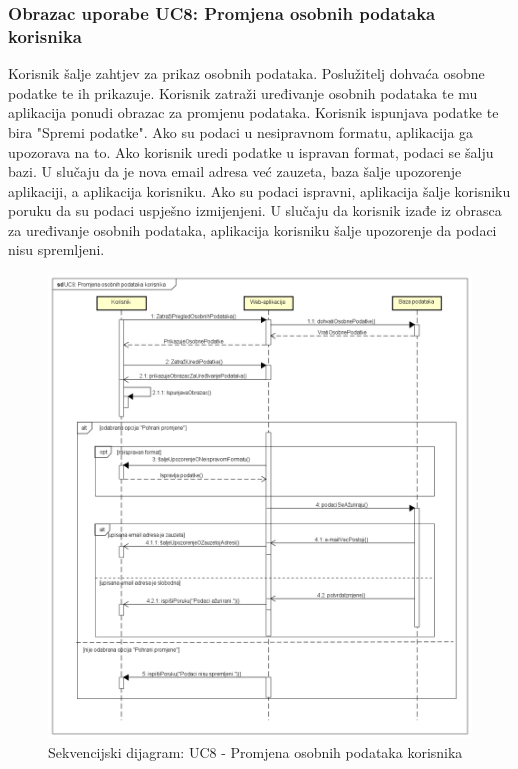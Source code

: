 			\subsubsection{Obrazac uporabe UC8: Promjena osobnih podataka korisnika}
			Korisnik šalje zahtjev za prikaz osobnih podataka. Poslužitelj dohvaća osobne podatke te ih prikazuje. Korisnik zatraži uređivanje osobnih podataka te mu aplikacija ponudi obrazac za promjenu podataka. Korisnik ispunjava podatke te bira "Spremi podatke". Ako su podaci u nesipravnom formatu, aplikacija ga upozorava na to. Ako korisnik uredi podatke u ispravan format, podaci se šalju bazi. U slučaju da je nova email adresa već zauzeta, baza šalje upozorenje aplikaciji, a aplikacija korisniku. Ako su podaci ispravni, aplikacija šalje korisniku poruku da su podaci uspješno izmijenjeni. U slučaju da korisnik izađe iz obrasca za uređivanje osobnih podataka, aplikacija korisniku šalje upozorenje da podaci nisu spremljeni.
			\begin{figure}[H]
				\includegraphics[scale=0.5]{dijagrami/UC8.png} %
				\caption{Sekvencijski dijagram: UC8 - Promjena osobnih podataka korisnika}
				\label{fig:UC8} %
			\end{figure}
		
